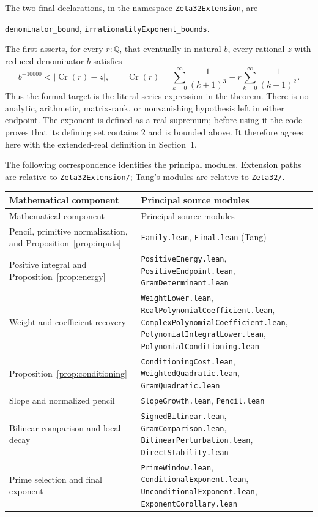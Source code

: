 \documentclass[11pt]{article}
\numberwithin{equation}{section}
\newcommand{\Q}{\mathbb Q}
\begin{document}
The two final declarations, in the namespace \texttt{Zeta32Extension}, are
\begin{center}
 \texttt{denominator\_bound},\qquad
 \texttt{irrationalityExponent\_bounds}.
\end{center}
The first asserts, for every $r:\Q$, that eventually in natural $b$,
every rational $z$ with reduced denominator $b$ satisfies
\[
 b^{-10000}<|\operatorname{Cr}(r)-z|,
 \qquad
 \operatorname{Cr}(r)=\sum_{k=0}^{\infty}\frac1{(k+1)^3}
                   -r\sum_{k=0}^{\infty}\frac1{(k+1)^2}.
\]
Thus the formal target is the literal series expression in the theorem.
There is no analytic, arithmetic, matrix-rank, or nonvanishing hypothesis
left in either endpoint. The exponent is defined as a real supremum;
before using it the code proves that its defining set contains $2$ and
is bounded above. It therefore agrees here with the extended-real
definition in Section~1.

The following correspondence identifies the principal modules. Extension
paths are relative to \texttt{Zeta32Extension/}; Tang's modules are
relative to \texttt{Zeta32/}.

{\small
\begin{longtable}{@{}>{\raggedright\arraybackslash}p{}
                    >{\raggedright\arraybackslash}p{}@{}}
\toprule
Mathematical component & Principal source modules\\
\midrule
\endfirsthead
\toprule
Mathematical component & Principal source modules\\
\midrule
\endhead
\bottomrule
\endfoot
Pencil, primitive normalization, and Proposition~\ref{prop:inputs}
 & \texttt{Family.lean}, \texttt{Final.lean} (Tang)\\[4pt]
Positive integral and Proposition~\ref{prop:energy}
 & \texttt{PositiveEnergy.lean}, \texttt{PositiveEndpoint.lean},
   \texttt{GramDeterminant.lean}\\[4pt]
Weight and coefficient recovery
 & \texttt{WeightLower.lean}, \texttt{RealPolynomialCoefficient.lean},
   \texttt{ComplexPolynomialCoefficient.lean},
   \texttt{PolynomialIntegralLower.lean}, \texttt{PolynomialConditioning.lean}\\[4pt]
Proposition~\ref{prop:conditioning}
 & \texttt{ConditioningCost.lean}, \texttt{WeightedQuadratic.lean},
   \texttt{GramQuadratic.lean}\\[4pt]
Slope and normalized pencil
 & \texttt{SlopeGrowth.lean}, \texttt{Pencil.lean}\\[4pt]
Bilinear comparison and local decay
 & \texttt{SignedBilinear.lean}, \texttt{GramComparison.lean},
   \texttt{BilinearPerturbation.lean}, \texttt{DirectStability.lean}\\[4pt]
Prime selection and final exponent
 & \texttt{PrimeWindow.lean}, \texttt{ConditionalExponent.lean},
   \texttt{UnconditionalExponent.lean}, \texttt{ExponentCorollary.lean}\\
\end{longtable}
}
\end{document}
